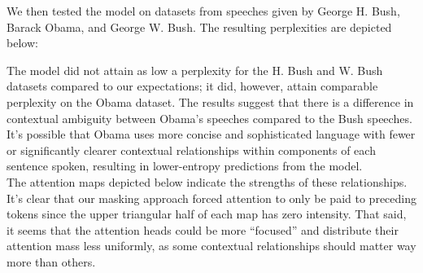 \documentclass[10pt]{article}
\theoremstyle{definition}
\begin{document}
\begin{center}
\end{center}

\noindent We then tested the model on datasets from speeches given by George H. Bush, Barack Obama, and George W. Bush. The resulting perplexities are depicted below: 
\begin{center}
\end{center}
The model did not attain as low a perplexity for the H. Bush and W. Bush datasets compared to our expectations; it did, however, attain comparable perplexity on the Obama dataset. The results suggest that there is a difference in contextual ambiguity between Obama's speeches compared to the Bush speeches. It's possible that Obama uses more concise and sophisticated language with fewer or significantly clearer contextual relationships within components of each sentence spoken, resulting in lower-entropy predictions from the model.\\

\noindent The attention maps depicted below indicate the strengths of these relationships. It's clear that our masking approach forced attention to only be paid to preceding tokens since the upper triangular half of each map has zero intensity. That said, it seems that the attention heads could be more ``focused'' and distribute their attention mass less uniformly, as some contextual relationships should matter way more than others.
\end{document}
